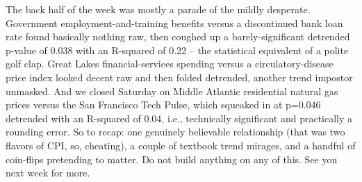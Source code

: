 The back half of the week was mostly a parade of the mildly desperate. Government employment-and-training benefits versus a discontinued bank loan rate found basically nothing raw, then coughed up a barely-significant detrended p-value of 0.038 with an R-squared of 0.22 -- the statistical equivalent of a polite golf clap. Great Lakes financial-services spending versus a circulatory-disease price index looked decent raw and then folded detrended, another trend impostor unmasked. And we closed Saturday on Middle Atlantic residential natural gas prices versus the San Francisco Tech Pulse, which squeaked in at p=0.046 detrended with an R-squared of 0.04, i.e., technically significant and practically a rounding error. So to recap: one genuinely believable relationship (that was two flavors of CPI, so, cheating), a couple of textbook trend mirages, and a handful of coin-flips pretending to matter. Do not build anything on any of this. See you next week for more.
